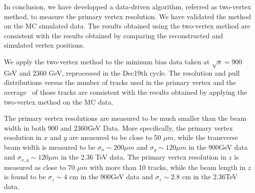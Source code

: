 In conclusion, we have developped a data-driven algorithm, 
referred as two-vertex method, to measure the primary vertex resolution. 
We have validated the method on the MC simulated data. 
The results obtained using the two-vertex method are 
consistent with the results obtained by comparing 
the reconstructed and simulated vertex positions. 

We apply the two-vertex method to the mininum bias data taken at 
$\sqrt{s}=$900 GeV and 2360 GeV, reprocessed in the Dec19th cycle. 
The resolution and pull distributions versus the number 
of tracks used in the primary vertex and the average \pt\, of those tracks 
are consistent with the results obtained by applying the two-vertex 
method on the MC data. 

The primary vertex resolutions are measured to be much smaller than 
the beam width in both 900 and 2360GeV Data.
More specifically, the primary vertex resolution in $x$ and $y$
are measured to be close to 50 $\mu m$, while the transverse beam width is 
measured to be $\sigma_x \sim 200\mu m$ and $\sigma_y \sim 120\mu m$ 
in the 900GeV data and $\sigma_{x,y}\sim 120\mu m$ in the 
2.36 TeV data.
The primary vertex resolution in $z$ is measured as close to 
70 $\mu m$ with more than 10 tracks, while the beam length in $z$
is found to be $\sigma_z\sim 4$ cm in the 900GeV data and 
$\sigma_z\sim 2.8$ cm in the 2.36TeV data.




